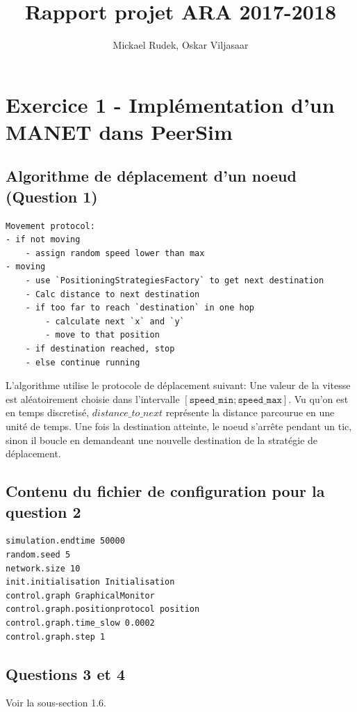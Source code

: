 \documentclass[a4paper]{article}
\title{Rapport projet ARA 2017-2018}
\author{Mickael Rudek, Oskar Viljasaar}
\begin{document}
\maketitle


\tableofcontents
\pagebreak
\section{Exercice 1 - Implémentation d'un MANET dans PeerSim}
\subsection{Algorithme de déplacement d'un noeud (Question 1)}

\begin{verbatim}
Movement protocol:
- if not moving
    - assign random speed lower than max
- moving
    - use `PositioningStrategiesFactory` to get next destination
    - Calc distance to next destination
    - if too far to reach `destination` in one hop
        - calculate next `x` and `y`
        - move to that position
    - if destination reached, stop
    - else continue running
\end{verbatim}
L'algorithme utilise le protocole de déplacement suivant:
Une valeur de la vitesse est aléatoirement choisie dans l'intervalle
$ \left[ \texttt{speed\_min}; \texttt{speed\_max} \right] $.
Vu qu'on est en temps discretisé, $distance\_to\_next$ représente la
distance parcourue en une unité de temps.
Une fois la destination atteinte, le noeud s'arrête pendant un tic,
 sinon il boucle en demandeant une nouvelle destination de la
 stratégie de déplacement.


 \subsection{Contenu du fichier de configuration pour la question 2}

\begin{verbatim}
simulation.endtime 50000
random.seed 5
network.size 10
init.initialisation Initialisation
control.graph GraphicalMonitor
control.graph.positionprotocol position
control.graph.time_slow 0.0002
control.graph.step 1
\end{verbatim}

\subsection{Questions 3 et 4}
Voir la sous-section 1.6.
\end{document}
